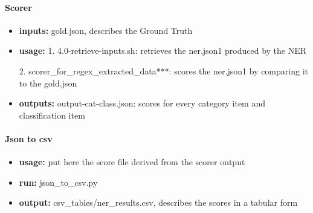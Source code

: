 \documentclass[12pt,leqno]{amsart}
\begin{document}
\newpage
\paragraph{\textbf{Scorer}}
\begin{itemize}
\item{\textbf{inputs: }}
gold.json, describes the Ground Truth
\item{\textbf{usage: }}
1. 4.0-retrieve-inputs.sh: retrieves the ner.json1 produced by the  NER


2. scorer\_for\_regex\_extracted\_data***: scores the  ner.json1 by comparing it to the gold.json
\item{\textbf{outputs: }}output-cat-class.json: scores for every category item and classification item
\end{itemize}
\begin{figure}[ht]
\end{figure}


\paragraph{\textbf{Json to csv}}
\begin{itemize}
\item{\textbf{usage: }}put here the score file derived from the scorer output
\item{\textbf{run: }}json\_to\_csv.py 
\item{\textbf{output: }}csv\_tables/ner\_results.csv, describes the scores in a tabular form
\end{itemize}
\begin{figure}[ht]
\end{figure}

\end{document}
